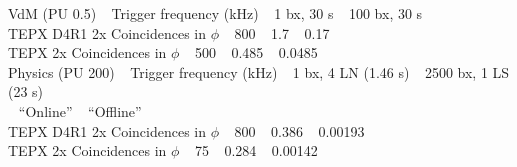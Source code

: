 VdM (PU 0.5) $\:\:$  Trigger frequency (kHz) $\:\:$ 1 bx, 30 s $\:\:$ 100 bx, 30 s \\
TEPX D4R1 2x Coincidences in $\phi$  $\:\:$  800        $\:\:$   1.7         $\:\:$       0.17   \\
TEPX 2x Coincidences in $\phi$   $\:\:$     500        $\:\:$   0.485       $\:\:$       0.0485   \\




Physics (PU 200)  $\:\:$ Trigger frequency (kHz)   $\:\:$   1 bx, 4 LN (1.46 s)   $\:\:$     2500 bx, 1 LS (23 s)  \\
                                                      $\:\:$           ``Online''          $\:\:$           ``Offline''      \\
TEPX D4R1 2x Coincidences in $\phi$  $\:\:$   800                $\:\:$   0.386           $\:\:$            0.00193         \\
TEPX 2x Coincidences in $\phi$       $\:\:$   75           $\:\:$         0.284           $\:\:$            0.00142         \\

